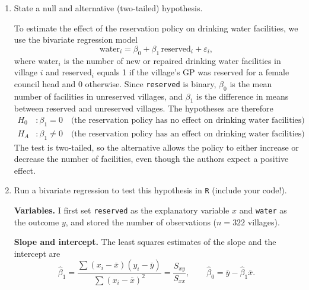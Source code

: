 \documentclass[12pt,letterpaper]{article}
\begin{document}
	\newpage
	\begin{enumerate}
		\item [(a)] State a null and alternative (two-tailed) hypothesis. 
		
		\vspace{.25cm}
		\noindent To estimate the effect of the reservation policy on drinking water facilities, we use the bivariate regression model
		\begin{equation*}
			\text{water}_i = \beta_0 + \beta_1\,\text{reserved}_i + \varepsilon_i,
		\end{equation*}
		where $\text{water}_i$ is the number of new or repaired drinking water facilities in village $i$ and $\text{reserved}_i$ equals 1 if the village's GP was reserved for a female council head and 0 otherwise. Since \texttt{reserved} is binary, $\beta_0$ is the mean number of facilities in unreserved villages, and $\beta_1$ is the difference in means between reserved and unreserved villages. The hypotheses are therefore
		\begin{align*}
			H_0 &: \beta_1 = 0 \quad \text{(the reservation policy has no effect on drinking water facilities)}\\
			H_A &: \beta_1 \neq 0 \quad \text{(the reservation policy has an effect on drinking water facilities)}
		\end{align*}
		The test is two-tailed, so the alternative allows the policy to either increase or decrease the number of facilities, even though the authors expect a positive effect.
		
		\item [(b)] Run a bivariate regression to test this hypothesis in \texttt{R} (include your code!).
		
		\vspace{.25cm}
		\noindent\textbf{Variables.} I first set \texttt{reserved} as the explanatory variable $x$ and \texttt{water} as the outcome $y$, and stored the number of observations ($n = 322$ villages).
		
		
		
		\noindent\textbf{Slope and intercept.} The least squares estimates of the slope and the intercept are
		\begin{equation*}
			\hat\beta_1 = \frac{\sum (x_i - \bar{x})(y_i - \bar{y})}{\sum (x_i - \bar{x})^2} = \frac{S_{xy}}{S_{xx}}, \qquad \hat\beta_0 = \bar{y} - \hat\beta_1 \bar{x}.
		\end{equation*}
		

\end{enumerate}
\end{document}
